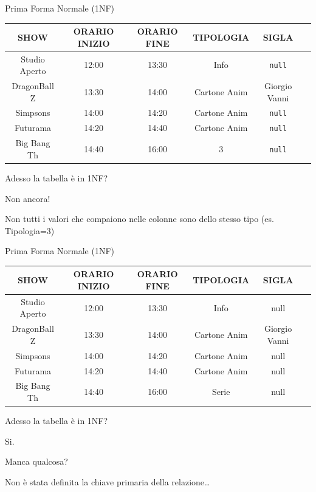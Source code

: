%
\begin{frame}{Prima Forma Normale (1NF)}
\begin{table}[h]
    \centering
    \begin{tabular}{|c|c|c|c|c|c|}
        \hline
        \rowcolor{cyan!30} \textbf{SHOW} & \textbf{ORARIO INIZIO} & \textbf{ORARIO FINE} & \textbf{TIPOLOGIA} & \textbf{SIGLA} \\ \hline
        Studio Aperto & 12:00 & 13:30 & Info & \texttt{null} \\ \hline
        DragonBall Z & 13:30 & 14:00 & Cartone Anim & Giorgio Vanni \\ \hline
        Simpsons & 14:00 & 14:20 & Cartone Anim & \texttt{null} \\ \hline
        Futurama & 14:20 & 14:40 & Cartone Anim & \texttt{null} \\ \hline
        Big Bang Th & 14:40 & 16:00 & 3 & \texttt{null} \\ \hline
    \end{tabular}
\end{table}
Adesso la tabella \`e in 1NF?
\pause

Non ancora!

Non tutti i valori che compaiono nelle colonne sono dello stesso tipo (es. Tipologia=3)
\end{frame}
%
\begin{frame}{Prima Forma Normale (1NF)}
\begin{table}[h]
    \centering
    \begin{tabular}{|c|c|c|c|c|c|}
        \hline
        \rowcolor{cyan!30} \textbf{SHOW} & \textbf{ORARIO INIZIO} & \textbf{ORARIO FINE} & \textbf{TIPOLOGIA} & \textbf{SIGLA} \\ \hline
        Studio Aperto & 12:00 & 13:30 & Info & null \\ \hline
        DragonBall Z & 13:30 & 14:00 & Cartone Anim & Giorgio Vanni \\ \hline
        Simpsons & 14:00 & 14:20 & Cartone Anim & null \\ \hline
        Futurama & 14:20 & 14:40 & Cartone Anim & null \\ \hline
        Big Bang Th & 14:40 & 16:00 & Serie & null \\ \hline
    \end{tabular}
\end{table}
Adesso la tabella \`e in 1NF?
\pause

Si.
\pause

Manca qualcosa?

\pause
Non \`e stata definita la chiave primaria della relazione\ldots
\end{frame}
